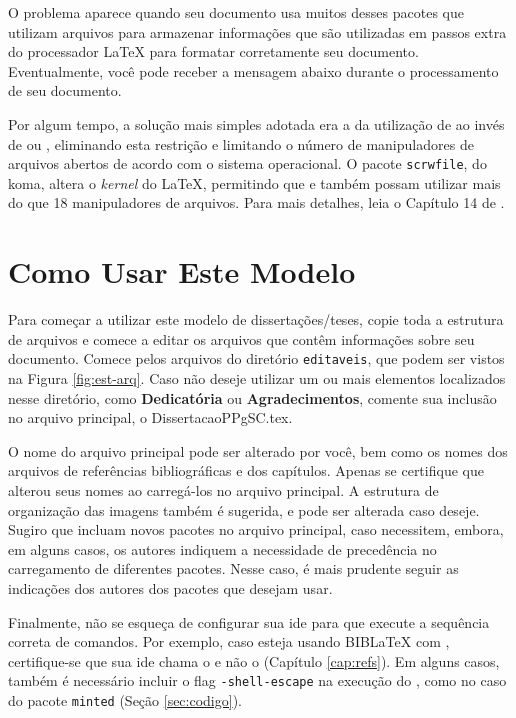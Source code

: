 O problema aparece quando seu documento usa muitos desses pacotes que utilizam arquivos para armazenar informações que são utilizadas em passos extra do processador \LaTeX{} para formatar corretamente seu documento. Eventualmente, você pode receber a mensagem abaixo durante o processamento de seu documento. 


Por algum tempo, a solução mais simples adotada era a da utilização de  ao invés de  ou , eliminando esta restrição e limitando o número de manipuladores de arquivos abertos de acordo com o sistema operacional. O pacote \texttt{scrwfile}, do \gls{koma}, altera o \textit{kernel} do \LaTeX{}, permitindo que  e  também possam utilizar mais do que 18 manipuladores de arquivos. Para mais detalhes, leia o Capítulo 14 de \parencite{koma}.

\section{Como Usar Este Modelo}

Para começar a utilizar este modelo de dissertações/teses, copie toda a estrutura de arquivos e comece a editar os arquivos que contêm informações sobre seu documento. Comece pelos arquivos do diretório \texttt{editaveis}, que podem ser vistos na Figura \ref{fig:est-arq}. Caso não deseje utilizar um ou mais elementos localizados nesse diretório, como \textbf{Dedicatória} ou \textbf{Agradecimentos}, comente sua inclusão no arquivo principal, o DissertacaoPPgSC.tex. 

O nome do arquivo principal pode ser alterado por você, bem como os nomes dos arquivos de referências bibliográficas e dos capítulos. Apenas se certifique que alterou seus nomes ao carregá-los no arquivo principal. A estrutura de organização das imagens também é sugerida, e pode ser alterada caso deseje. Sugiro que incluam novos pacotes no arquivo principal, caso necessitem, embora, em alguns casos, os autores indiquem a necessidade de precedência no carregamento de diferentes pacotes. Nesse caso, é mais prudente seguir as indicações dos autores dos pacotes que desejam usar.

Finalmente, não se esqueça de configurar sua \gls{ide} para que execute a sequência correta de comandos. Por exemplo, caso esteja usando BIB\LaTeX{} com , certifique-se que sua \gls{ide} chama o  e não o \BibTeX{} (Capítulo \ref{cap:refs}). Em alguns casos, também é necessário incluir o flag \texttt{-shell-escape} na execução do , como no caso do pacote \texttt{minted} (Seção \ref{sec:codigo}).

